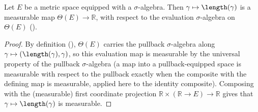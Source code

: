 \begin{helper}
  Let $E$ be a metric space equipped with a $\sigma$-algebra. Then $\gamma \mapsto \length(\gamma)$
  is a measurable map $\Theta(E) \to \mathbb{R}$, with respect to the evaluation $\sigma$-algebra on
  $\Theta(E)$ ().
\end{helper}
\begin{proof}
  By definition (), $\Theta(E)$ carries the pullback $\sigma$-algebra
  along $\gamma \mapsto (\length(\gamma),\gamma)$, so this evaluation map is measurable by the
  universal property of the pullback $\sigma$-algebra (a map into a pullback-equipped space is
  measurable with respect to the pullback exactly when the composite with the defining map is
  measurable, applied here to the identity composite). Composing with the (measurable) first
  coordinate projection $\mathbb{R} \times (\mathbb{R}\to E) \to \mathbb{R}$ gives that
  $\gamma \mapsto \length(\gamma)$ is measurable.
\end{proof}
